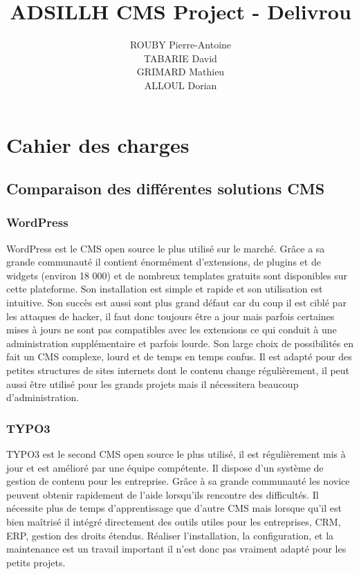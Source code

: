 \documentclass[a4paper,12pt]{report}
\title{ADSILLH CMS Project - Delivrou}
\author{ROUBY Pierre-Antoine \\ TABARIE David \\ GRIMARD Mathieu \\
  ALLOUL Dorian}
\begin{document}
\maketitle
\tableofcontents

\begin{abstract}
\end{abstract}

\part{Cahier des charges}
\chapter{Comparaison des différentes solutions CMS}
\section{WordPress}

WordPress est le CMS open source le plus utilisé sur le marché. Grâce
a sa grande communauté il contient énormément d’extensions, de plugins
et de widgets (environ 18 000) et de nombreux templates gratuits sont
disponibles sur cette plateforme. Son installation est simple et
rapide et son utilisation est intuitive.  Son succès est aussi sont
plus grand défaut car du coup il est ciblé par les attaques de hacker,
il faut donc toujours être a jour mais parfois certaines mises à jours
ne sont pas compatibles avec les extensions ce qui conduit à une
administration supplémentaire et parfois lourde. Son large choix de
possibilités en fait un CMS complexe, lourd et de temps en temps
confus.  Il est adapté pour des petites structures de sites internets
dont le contenu change régulièrement, il peut aussi être utilisé pour
les grands projets mais il nécessitera beaucoup d'administration.

\section{TYPO3}

TYPO3 est le second CMS open source le plus utilisé, il est
régulièrement mis à jour et est amélioré par une équipe compétente. Il
dispose d'un système de gestion de contenu pour les entreprise.  Grâce
à sa grande communauté les novice peuvent obtenir rapidement de l'aide
lorsqu'ils rencontre des difficultés.  Il nécessite plus de temps
d'apprentissage que d'autre CMS mais lorsque qu'il est bien maîtrisé
il intégré directement des outils utiles pour les entreprises, CRM,
ERP, gestion des droits étendus.  Réaliser l’installation, la
configuration, et la maintenance est un travail important il n'est
donc pas vraiment adapté pour les petits projets.
\end{document}
